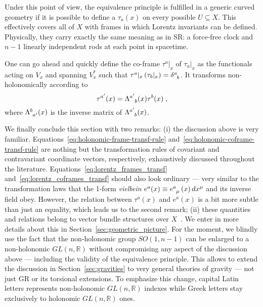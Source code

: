 \documentclass[../../main.tex]{subfiles}
\begin{document}
Under this point of view, the equivalence principle is fulfilled in a generic curved geometry if it is possible to define a $\tau_a(x)$ on every possible $ U \subseteq X $. This effectively covers all of $X$ with frames in which Lorentz invariants can be defined. Physically, they carry exactly the same meaning as in SR\@: a force-free clock and $n-1$ linearly independent rods at each point in spacetime.

One can go ahead and quickly define the co-frame $\tau^a|_x$ of $\tau_a|_x$ as the functionals acting on $V_x$ and spanning $V_x^*$ such that $\tau^a|_x \left(\tau_b|_x\right)=\tensor{\delta}{^a_b}$. It transforms non-holonomically according to
\begin{equation}
  \label{eq:lorentz_coframes_transf}
  {\tau}^{a'}(x) = \tensor{\Lambda}{^{a'}_b}(x)\tau^b(x) \;,
\end{equation}
where $\tensor{\Lambda}{^b_{a'}}(x)$ is the inverse matrix of $\tensor{\Lambda}{^{a'}_b}(x)$.

We finally conclude this section with two remarks: (i) the discussion above is very familiar. Equations~\eqref{eq:holonomic-frame-transf-rule} and~\eqref{eq:holonomic-coframe-transf-rule} are nothing but the transformation rules of covariant and contravariant coordinate vectors, respectively, exhaustively discussed throughout the literature. Equations~\eqref{eq:lorentz_frames_transf} and~\eqref{eq:lorentz_coframes_transf} should also look ordinary --- very similar to the transformation laws that the 1-form \textit{vielbein} $e^a(x)\equiv \tensor{e}{^a_\mu}\left(x\right)dx^\mu$ and its inverse field obey. However, the relation between $\tau^a(x)$ and $e^a(x)$ is a bit more subtle than just an equality, which leads us to the second remark; (ii) these quantities and relations belong to vector bundle structures over $X$~\cite{trautman1970}. We enter in more details about this in Section~\ref{sec:geometric_picture}. For the moment, we blindly use the fact that the non-holonomic group $SO(1,n-1)$ can be enlarged to a non-holonomic $GL(n,\mathbb{R})$ without compromising any aspect of the discussion above --- including the validity of the equivalence principle. This allows to extend the discussion in Section~\ref{sec:gravities} to very general theories of gravity --- not just GR or its torsional extensions. To emphasize this change, capital Latin letters represents non-holonomic $GL(n,\mathbb{R})$ indexes while Greek letters stay exclusively to holonomic $GL(n,\mathbb{R})$ ones.
\end{document}
